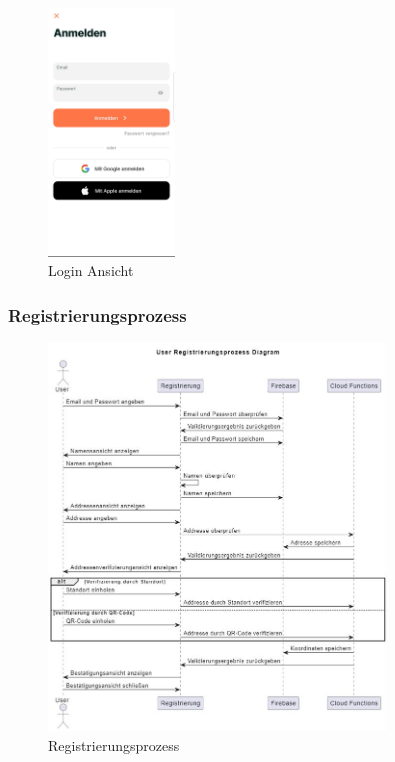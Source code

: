 \begin{figure}[h]
  \centering
  \includegraphics[width=0.3\textwidth]{pics/login-page.jpg}
  \caption{Login Ansicht}
  \label{fig:login-page}
\end{figure}

\subsubsection{Registrierungsprozess}

\begin{figure}[h]
  \centering
  \includegraphics[width=0.8\textwidth]{pics/registration-sequence.JPG}
  \caption{Registrierungsprozess}
  \label{fig:registration-sequenze}
\end{figure}

